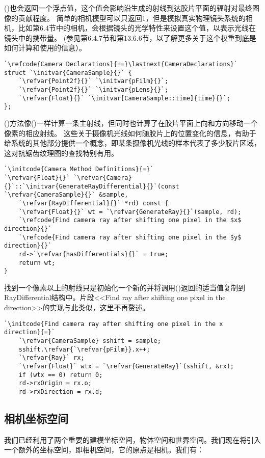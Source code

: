 ()也会返回一个浮点值，这个值会影响沿生成的射线到达胶片平面的辐射对最终图像的贡献程度。
简单的相机模型可以只返回1，但是模拟真实物理镜头系统的相机，比如第6.4节中的相机，会根据镜头的光学特性来设置这个值，以表示光线在镜头中的携带量。
(参见第6.4.7节和第13.6.6节，以了解更多关于这个权重到底是如何计算和使用的信息）。
\begin{lstlisting}
`\refcode{Camera Declarations}{+=}\lastnext{CameraDeclarations}`
struct `\initvar{CameraSample}{}` {
    `\refvar{Point2f}{}` `\initvar{pFilm}{}`;
    `\refvar{Point2f}{}` `\initvar{pLens}{}`;
    `\refvar{Float}{}` `\initvar[CameraSample::time]{time}{}`;
};
\end{lstlisting}
()方法像()一样计算一条主射线，但同时也计算了在胶片平面上向和方向移动一个像素的相应射线。
这些关于摄像机光线如何随胶片上的位置变化的信息，有助于给系统的其他部分提供一个概念，即某条摄像机光线的样本代表了多少胶片区域，这对抗锯齿纹理图的查找特别有用。
\begin{lstlisting}
`\initcode{Camera Method Definitions}{=}`
`\refvar{Float}{}` `\refvar{Camera}{}`::`\initvar{GenerateRayDifferential}{}`(const `\refvar{CameraSample}{}` &sample,
    `\refvar{RayDifferential}{}` *rd) const {
    `\refvar{Float}{}` wt = `\refvar{GenerateRay}{}`(sample, rd);
    `\refcode{Find camera ray after shifting one pixel in the $x$ direction}{}`
    `\refcode{Find camera ray after shifting one pixel in the $y$ direction}{}`
    rd->`\refvar{hasDifferentials}{}` = true;
    return wt;
}
\end{lstlisting}
找到一个像素以上的射线只是初始化一个新的并将调用()返回的适当值复制到RayDifferential结构中。片段<<Find ray after shifting one pixel in the  direction>>的实现与此类似，这里不再赘述。
\begin{lstlisting}
`\initcode{Find camera ray after shifting one pixel in the x direction}{=}`
    `\refvar{CameraSample} sshift = sample;
    sshift.\refvar{`\refvar{pFilm}}.x++;
    `\refvar{Ray}` rx;
    `\refvar{Float}` wtx = `\refvar{GenerateRay}`(sshift, &rx);
    if (wtx == 0) return 0;
    rd->rxOrigin = rx.o;
    rd->rxDirection = rx.d;
\end{lstlisting}

\subsection{相机坐标空间}\label{sub:相机坐标空间}
我们已经利用了两个重要的建模坐标空间，物体空间和世界空间。我们现在将引入一个额外的坐标空间，即相机空间，它的原点是相机。我们有：

